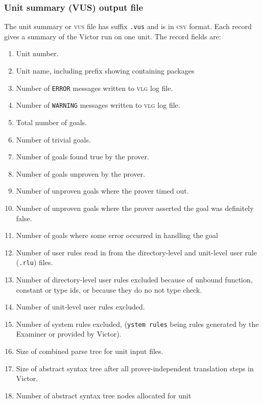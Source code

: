 \documentclass[12pt,fleqn]{article}
\newcommand{\logfile}{\textsc{vlg}}
\newcommand{\unitsumfile}{\textsc{vus}}
\newcommand{\csv}{\textsc{csv}}
\begin{document}
\subsubsection{Unit summary (VUS)  output file}
The unit summary or \unitsumfile{} file has suffix \texttt{.vus} and is
in \csv{} format.
Each record gives a summary of the Victor run on one unit.
The record fields are:
\begin{enumerate}

\item Unit number.
\item Unit name, including prefix showing containing packages

\item Number of \texttt{ERROR} messages written to \logfile{} log file.
\item Number of \texttt{WARNING} messages written to \logfile{} log file.

\item Total number of goals.
\item Number of trivial goals.
\item Number of goals found true by the prover.
\item Number of goals unproven by the prover.
\item Number of unproven goals where the prover timed out.
\item Number of unproven goals where the prover asserted the goal was
  definitely false.
\item Number of goals where some error occurred in handling the goal

\item Number of user rules read in from the directory-level and unit-level
  user rule (\texttt{.rlu}) files.
\item Number of directory-level user rules excluded because of unbound
  function, constant or type ids, or because they do no not type check.
\item Number of unit-level user rules excluded.
\item Number of system rules excluded, (\texttt{ystem rules} being rules
  generated by the Examiner or provided by Victor).

\item Size of combined parse tree for unit input files.
\item Size of abstract syntax tree after all prover-independent
  translation steps in Victor.
\item Number of abstract syntax tree nodes allocated for unit


\end{enumerate}
\end{document}
